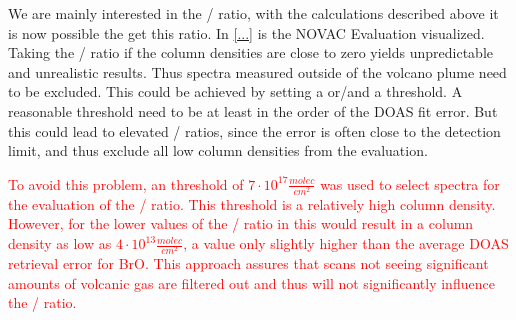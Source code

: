 \documentclass  [
  paper    = a4,
  BCOR     = 10mm,
  twoside,
  fontsize = 12pt,
  fleqn,
  toc      = bibnumbered,
  toc      = listofnumbered,
  numbers  = noendperiod,
  headings = normal,
  listof   = leveldown,
  version  = 3.03
]                                       {scrreprt}
\begin{document}
	We are mainly interested in the / ratio, with the calculations described above it is now possible the get this ratio.
	In \cref{...} is the NOVAC Evaluation visualized.\\
	Taking the / ratio if the column densities are close to zero yields unpredictable and unrealistic results. Thus spectra measured outside of the volcano plume need to be excluded.
	This could be achieved by setting a  or/and a  threshold. A reasonable  threshold need to be at least in the order of the DOAS fit error. But this could lead to elevated / ratios, since the  error is often close to the detection limit, and thus exclude all low  column densities from the evaluation.
	
	\textcolor{red}{	
	To avoid this problem, an  threshold of $7\cdot 10^{17} \frac{molec}{cm^2}$ was used
	to select spectra for the evaluation of the / ratio. This threshold is
	a relatively high  column density. However, for the lower values of the
	/ ratio in  this would result in a  column
	density as low as $4\cdot 10^{13} \frac{molec}{cm^2}$, a value only slightly higher than the
	average DOAS retrieval error for BrO. This approach assures that scans not seeing
	significant amounts of volcanic gas are filtered out and thus will not significantly
	influence the / ratio. \citealp{lubcke2014bro}}
	
\end{document}
